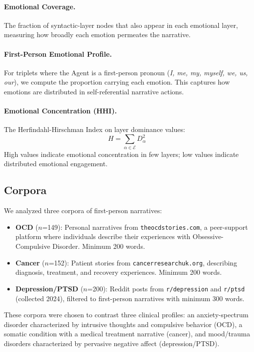 \documentclass[11pt,a4paper]{article}
\begin{document}
\paragraph{Emotional Coverage.} The fraction of syntactic-layer nodes that also appear in each emotional layer, measuring how broadly each emotion permeates the narrative.

\paragraph{First-Person Emotional Profile.} For triplets where the Agent is a first-person pronoun (\textit{I, me, my, myself, we, us, our}), we compute the proportion carrying each emotion.  This captures how emotions are distributed in self-referential narrative actions.

\paragraph{Emotional Concentration (HHI).} The Herfindahl-Hirschman Index on layer dominance values:
\begin{equation}
    H = \sum_{\alpha \in \mathcal{E}} D_\alpha^2
\end{equation}
High values indicate emotional concentration in few layers; low values indicate distributed emotional engagement.


\subsection{Corpora}
\label{sec:corpora}

We analyzed three corpora of first-person narratives:

\begin{itemize}
    \item \textbf{OCD} ($n$=149): Personal narratives from \texttt{theocdstories.com}, a peer-support platform where individuals describe their experiences with Obsessive-Compulsive Disorder.  Minimum 200 words.
    \item \textbf{Cancer} ($n$=152): Patient stories from \texttt{cancerresearchuk.org}, describing diagnosis, treatment, and recovery experiences.  Minimum 200 words.
    \item \textbf{Depression/PTSD} ($n$=200): Reddit posts from \texttt{r/depression} and \texttt{r/ptsd} (collected 2024), filtered to first-person narratives with minimum 300 words.
\end{itemize}

These corpora were chosen to contrast three clinical profiles: an anxiety-spectrum disorder characterized by intrusive thoughts and compulsive behavior (OCD), a somatic condition with a medical treatment narrative (cancer), and mood/trauma disorders characterized by pervasive negative affect (depression/PTSD).
\end{document}
